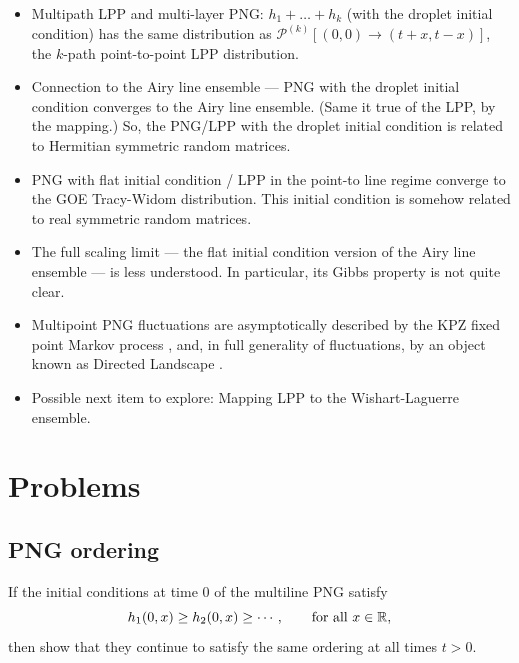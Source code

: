 \documentclass[letterpaper,11pt,oneside,reqno]{book}
\numberwithin{equation}{chapter}  %
\theoremstyle{definition}
\begin{document}
\begin{itemize}
	\item Multipath LPP and multi-layer PNG:
		$h_1+\ldots+h_k $ (with the droplet initial condition)
		has the same distribution as
		$\mathcal{P}^{(k)}[(0,0)\to (t+x,t-x)]$, the $k$-path point-to-point LPP distribution.
	\item Connection to the Airy line ensemble --- PNG with
		the droplet initial condition converges to the Airy line
		ensemble. (Same it true of the LPP, by the mapping.)
		So, the PNG/LPP with the droplet initial condition
		is related to Hermitian symmetric random matrices.
	\item PNG with flat initial condition / LPP in the point-to line regime
		converge to the GOE Tracy-Widom distribution.
		This initial condition is somehow related to real symmetric random matrices.
	\item The full scaling limit --- the flat initial condition
		version of the Airy line ensemble --- is less understood. In particular,
		its Gibbs property is not quite clear.
	\item Multipoint PNG fluctuations are asymptotically described by the
		KPZ fixed point Markov process \cite{matetski2017kpz},
		and, in full generality of fluctuations,
		by an object known as Directed Landscape \cite{directed_landscape}.
	\item Possible next item to explore:
		Mapping LPP to the Wishart-Laguerre ensemble.
\end{itemize}


























\section{Problems}


\subsection{PNG ordering}
\label{lecture12:prob:multiline-png}

If the initial conditions at time $0$ of the multiline PNG satisfy
\begin{equation*}
	h_1(0,x) \ge h_2(0,x) \ge \cdots ,\qquad \textnormal{for all } x\in\mathbb{R},
\end{equation*}
then show that they continue to satisfy the same ordering at all times $t>0$.
\end{document}
